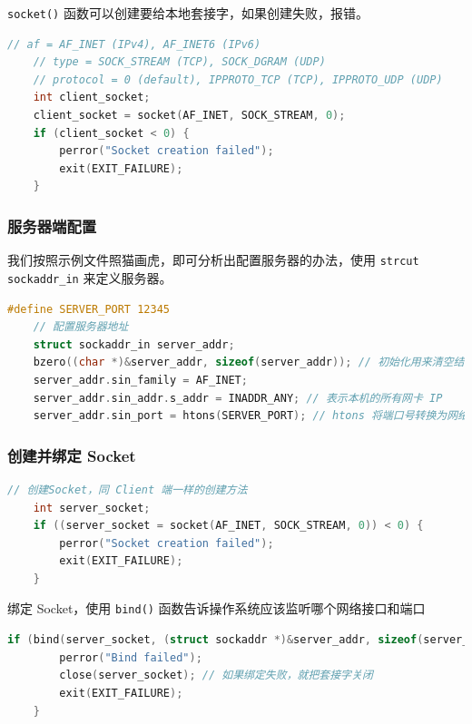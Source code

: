 \documentclass[14pt,a4paper,UTF8,twoside]{article}
\begin{document}
\texttt{socket()} 函数可以创建要给本地套接字，如果创建失败，报错。

\begin{lstlisting}[language=C, title={Create Socket}]
    // af = AF_INET (IPv4), AF_INET6 (IPv6)
    // type = SOCK_STREAM (TCP), SOCK_DGRAM (UDP)
    // protocol = 0 (default), IPPROTO_TCP (TCP), IPPROTO_UDP (UDP)
    int client_socket;
    client_socket = socket(AF_INET, SOCK_STREAM, 0);
    if (client_socket < 0) {
        perror("Socket creation failed");
        exit(EXIT_FAILURE);
    }
\end{lstlisting}

\subsubsection*{服务器端配置}

我们按照示例文件照猫画虎，即可分析出配置服务器的办法，使用 \texttt{strcut sockaddr\_in} 来定义服务器。

\begin{lstlisting}[language=C, title={Server Configuration}]
#define SERVER_PORT 12345
    // 配置服务器地址
    struct sockaddr_in server_addr;
    bzero((char *)&server_addr, sizeof(server_addr)); // 初始化用来清空结构体，保证安全一致 
    server_addr.sin_family = AF_INET;
    server_addr.sin_addr.s_addr = INADDR_ANY; // 表示本机的所有网卡 IP
    server_addr.sin_port = htons(SERVER_PORT); // htons 将端口号转换为网络字节序
\end{lstlisting}

\subsubsection*{创建并绑定 Socket}

\begin{lstlisting}[language=C]
    // 创建Socket，同 Client 端一样的创建方法
    int server_socket;
    if ((server_socket = socket(AF_INET, SOCK_STREAM, 0)) < 0) {
        perror("Socket creation failed");
        exit(EXIT_FAILURE);
    }
\end{lstlisting}

绑定 Socket，使用 \texttt{bind()} 函数告诉操作系统应该监听哪个网络接口和端口

\begin{lstlisting}[language=C]
    if (bind(server_socket, (struct sockaddr *)&server_addr, sizeof(server_addr)) < 0) {
        perror("Bind failed");
        close(server_socket); // 如果绑定失败，就把套接字关闭
        exit(EXIT_FAILURE);
    }
\end{lstlisting}
\end{document}
